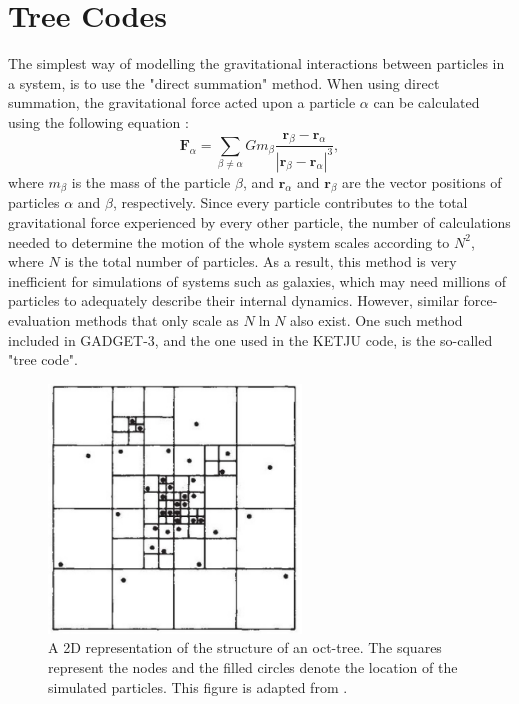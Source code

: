 \documentclass[english, oneside]{HYgradu}
\begin{document}
\section{Tree Codes} \label{section:tree}

The simplest way of modelling the gravitational interactions between particles in a system, is to use the "direct summation" method. When using direct summation, the gravitational force acted upon a particle $\alpha$ can be calculated using the following equation \citep{BinneyTremaine}:
\begin{equation}
\mathbf{F}_\alpha = \displaystyle\sum_{\beta \neq \alpha} Gm_\beta \frac{\mathbf{r}_\beta-\mathbf{r}_\alpha}{|\mathbf{r}_\beta-\mathbf{r}_\alpha|^3}, \label{eq:f_alpha}
\end{equation}
where $m_\beta$ is the mass of the particle $\beta$, and $\mathbf{r}_\alpha$ and $\mathbf{r}_\beta$ are the vector positions of particles $\alpha$ and $\beta$, respectively. Since every particle contributes to the total gravitational force experienced by every other particle, the number of calculations needed to determine the motion of the whole system scales according to $N^2$, where $N$ is the total number of particles. As a result, this method is very inefficient for simulations of systems such as galaxies, which may need millions of particles to adequately describe their internal dynamics. However, similar force-evaluation methods that only scale as $N\ln N$ also exist. One such method included in GADGET-3, and the one used in the KETJU code, is the so-called "tree code".

\begin{figure}
	\centering	
	\includegraphics[width=0.6\textwidth]{barnes_octtree.png}	
	\caption{A 2D representation of the structure of an oct-tree. The squares represent the nodes and the filled circles denote the location of the simulated particles. This figure is adapted from \cite{Barnes1986}.}
	\label{figure:oct_tree}
\end{figure}
\end{document}
